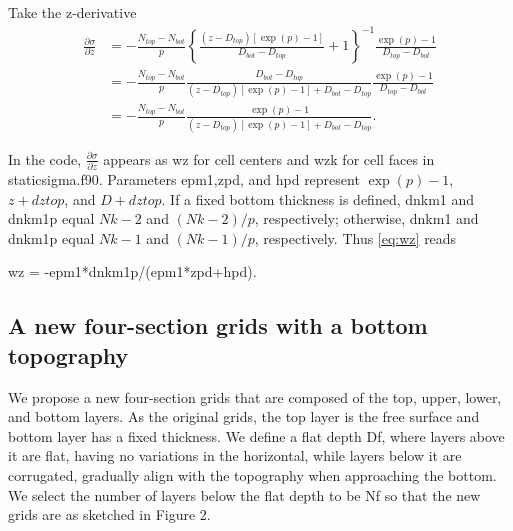 \documentclass[12pt,letterpaper,titlepage]{article}
\newcommand{\Blue}[1]{{\color{blue}#1}}
\begin{document}
Take the z-derivative
\begin{align}
  \frac{\partial \sigma}{\partial z} &=-\frac{N_{top}-N_{bot}}{p} \left\{\frac{(z-D_{top})[\exp(p)-1]}{D_{bot}-D_{top}} +1 \right\}^{-1} \frac{\exp(p)-1}{D_{top}-D_{bot}} \nonumber \\
  & =-\frac{N_{top}-N_{bot}}{p} \frac{D_{bot}-D_{top}}{(z-D_{top})[\exp(p)-1]+D_{bot}-D_{top}} \frac{\exp(p)-1}{D_{top}-D_{bot}} \nonumber \\
  &=-\frac{N_{top}-N_{bot}}{p} \frac{\exp(p)-1}{(z-D_{top})[\exp(p)-1]+D_{bot}-D_{top}}. \label{eq:wz}
\end{align}

In the code, $\frac{\partial \sigma}{\partial z}$ appears as \Blue{wz} for cell centers and \Blue{wzk} for cell faces in \Blue{staticsigma.f90}. Parameters \Blue{epm1},\Blue{zpd}, and \Blue{hpd} represent $\exp(p)-1$, $z+dztop$, and $D+dztop$. If a fixed bottom thickness is defined, \Blue{dnkm1} and \Blue{dnkm1p} equal $Nk-2$ and $(Nk-2)/p$, respectively; otherwise, \Blue{dnkm1} and \Blue{dnkm1p} equal $Nk-1$ and $(Nk-1)/p$, respectively. Thus \eqref{eq:wz} reads
\begin{center}
wz = -epm1*dnkm1p/(epm1*zpd+hpd).
\end{center}


\subsection{A new four-section grids with a bottom topography}

We propose a new four-section grids that are composed of the top, upper, lower, and bottom layers. As the original grids, the top layer is the free surface and bottom layer has a fixed thickness. We define a flat depth \Blue{Df}, where layers above it are flat, having no variations in the horizontal, while layers below it are corrugated, gradually align with the topography when approaching the bottom. We select the number of layers below the flat depth to be \Blue{Nf} so that the new grids are as sketched in Figure 2.\par
\end{document}
